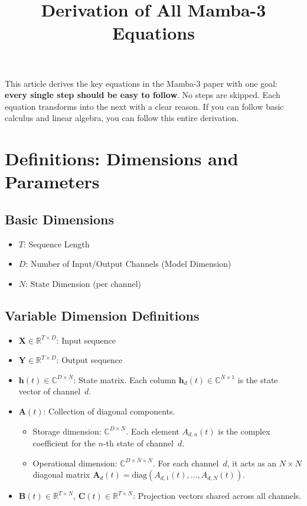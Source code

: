 \documentclass[11pt,a4paper]{article}
\title{Derivation of All Mamba-3 Equations}
\author{}
\date{}
\begin{document}
\maketitle

This article derives the key equations in the Mamba-3 paper with one goal: \textbf{every single step should be easy to follow}. No steps are skipped. Each equation transforms into the next with a clear reason. If you can follow basic calculus and linear algebra, you can follow this entire derivation.

\section{Definitions: Dimensions and Parameters}

\subsection{Basic Dimensions}

\begin{itemize}
  \item $T$: Sequence Length
  \item $D$: Number of Input/Output Channels (Model Dimension)
  \item $N$: State Dimension (per channel)
\end{itemize}

\subsection{Variable Dimension Definitions}

\begin{itemize}
  \item $\mathbf{X} \in \mathbb{R}^{T \times D}$: Input sequence
  \item $\mathbf{Y} \in \mathbb{R}^{T \times D}$: Output sequence
  \item $\mathbf{h}(t) \in \mathbb{C}^{D \times N}$: State matrix. Each column $\mathbf{h}_d(t) \in \mathbb{C}^{N \times 1}$ is the state vector of channel~$d$.
  \item $\mathbf{A}(t)$: Collection of diagonal components.
    \begin{itemize}
      \item Storage dimension: $\mathbb{C}^{D \times N}$. Each element $A_{d,n}(t)$ is the complex coefficient for the $n$-th state of channel~$d$.
      \item Operational dimension: $\mathbb{C}^{D \times N \times N}$. For each channel~$d$, it acts as an $N \times N$ diagonal matrix $\mathbf{A}_d(t) = \mathrm{diag}(A_{d,1}(t), \dots, A_{d,N}(t))$.
    \end{itemize}
  \item $\mathbf{B}(t) \in \mathbb{R}^{T \times N}$, $\mathbf{C}(t) \in \mathbb{R}^{T \times N}$: Projection vectors shared across all channels.
\end{itemize}
\end{document}
